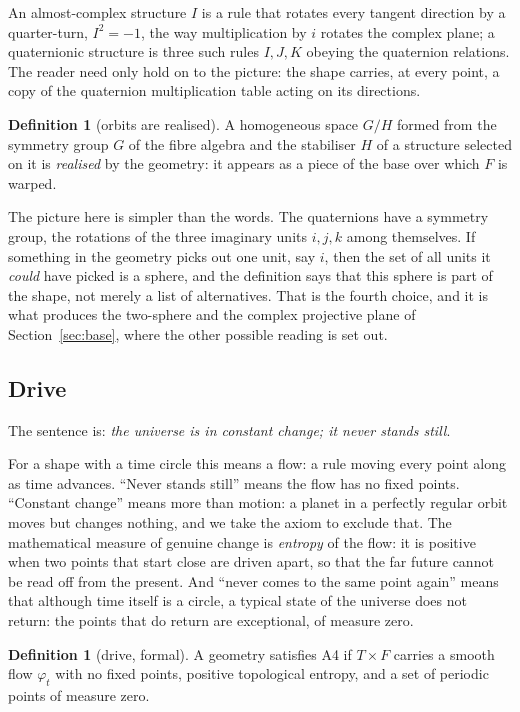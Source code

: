 \documentclass[11pt,a4paper]{article}
\theoremstyle{plain}
\theoremstyle{definition}
\newtheorem{definition}[theorem]{Definition}
\theoremstyle{remark}
\begin{document}
An almost-complex structure $I$ is a rule that rotates every tangent direction by a quarter-turn, $I^{2}=-1$, the way multiplication by $i$ rotates the complex plane; a quaternionic structure is three such rules $I,J,K$ obeying the quaternion relations. The reader need only hold on to the picture: the shape carries, at every point, a copy of the quaternion multiplication table acting on its directions.

\begin{definition}[orbits are realised]\label{def:orbits}
A homogeneous space $G/H$ formed from the symmetry group $G$ of the fibre algebra and the stabiliser $H$ of a structure selected on it is \emph{realised} by the geometry: it appears as a piece of the base over which $F$ is warped.
\end{definition}

The picture here is simpler than the words. The quaternions have a symmetry group, the rotations of the three imaginary units $i,j,k$ among themselves. If something in the geometry picks out one unit, say $i$, then the set of all units it \emph{could} have picked is a sphere, and the definition says that this sphere is part of the shape, not merely a list of alternatives. That is the fourth choice, and it is what produces the two-sphere and the complex projective plane of Section~\ref{sec:base}, where the other possible reading is set out.

\subsection{Drive}\label{sec:A4}

The sentence is: \emph{the universe is in constant change; it never stands still}.

For a shape with a time circle this means a flow: a rule moving every point along as time advances. ``Never stands still'' means the flow has no fixed points. ``Constant change'' means more than motion: a planet in a perfectly regular orbit moves but changes nothing, and we take the axiom to exclude that. The mathematical measure of genuine change is \emph{entropy} of the flow: it is positive when two points that start close are driven apart, so that the far future cannot be read off from the present. And ``never comes to the same point again'' means that although time itself is a circle, a typical state of the universe does not return: the points that do return are exceptional, of measure zero.

\begin{definition}[drive, formal]\label{def:A4}
A geometry satisfies A4 if $T\times F$ carries a smooth flow $\varphi_{t}$ with no fixed points, positive topological entropy, and a set of periodic points of measure zero.
\end{definition}
\end{document}
